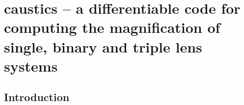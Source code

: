 \documentclass[12pt,dvipsnames]{report}
\newcommand{\ssf}[1]{\textsf{#1}}
\begin{document}
%

\chapter{\ssf{caustics} -- a differentiable code for computing the
  magnification of single, binary and triple lens systems}
\label{ch:caustics}

\section{Introduction}
\end{document}
